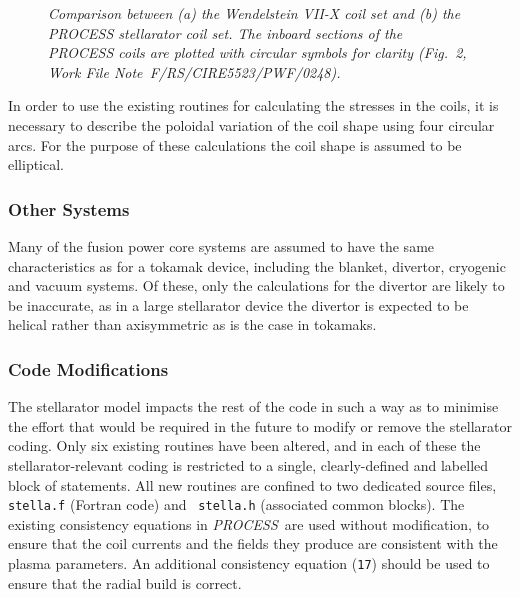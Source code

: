 \documentclass[11pt,a4paper]{report}
\newcommand{\PS}{\mbox{\it PROCESS\/ }}
\begin{document}
\begin{figure}
\vspace*{180mm}
\caption[tosh]{\it Comparison between (a) the Wendelstein VII-X coil set and
(b) the PROCESS stellarator coil set. The inboard sections of the PROCESS
coils are plotted with circular symbols for clarity (Fig.~2, Work File
Note~F/RS/CIRE5523/PWF/0248).}
\label{fig:stell2}
\end{figure}

In order to use the existing routines for calculating the stresses in the
coils, it is necessary to describe the poloidal variation of the coil shape
using four circular arcs. For the purpose of these calculations the coil shape
is assumed to be elliptical.

\subsubsection{Other Systems}
Many of the fusion power core systems are assumed to have the same
characteristics as for a tokamak device, including the blanket, divertor,
cryogenic and vacuum systems. Of these, only the calculations for the divertor
are likely to be inaccurate, as in a large stellarator device the divertor is
expected to be helical rather than axisymmetric as is the case in tokamaks.

\subsubsection{Code Modifications}
The stellarator model impacts the rest of the code in such a way as to
minimise the effort that would be required in the future to modify or remove
the stellarator coding. Only six existing routines have been altered, and in
each of these the stellarator-relevant coding is restricted to a single,
clearly-defined and labelled block of statements. All new routines are
confined to two dedicated source files, {\tt stella.f} (Fortran code) and {\tt
stella.h} (associated common blocks). The existing consistency equations in
\PS are used without modification, to ensure that the coil currents and the
fields they produce are consistent with the plasma parameters. An additional
consistency equation (\texttt{17}) should be used to ensure that the radial
build is correct.
\end{document}
